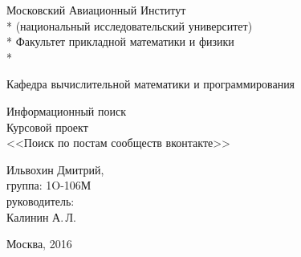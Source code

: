 \begin{titlepage}

\newcommand{\StudentName}{Ильвохин Дмитрий}
\newcommand{\Group}{1O-106М}
\newcommand{\CourseName}{Информационный поиск}
\newcommand{\LabNum}{1}
\newcommand{\Subject}{Поиск по постам сообществ вконтакте}
\newcommand{\PrepName}{Калинин А.\,Л.}

\newpage

\begin{center}
Московский Авиационный Институт \\*
(национальный исследовательский университет) \\*
Факультет прикладной математики и физики \\*
\hrulefill
\end{center}

\begin{center}
Кафедра вычислительной математики и программирования
\end{center}

\vspace{6em}

\begin{center}
\Large \CourseName \\
	Курсовой проект \\
  <<\Subject>>
\end{center}

\vspace{2em}
\vspace{6em}

\begin{flushright}
	\StudentName, \\
	группа: \Group \\
\vspace{1em}
руководитель:\\
   \PrepName \\
\end{flushright}

\vspace{\fill}

\begin{center}
Москва, 2016
\end{center}

\end{titlepage}
